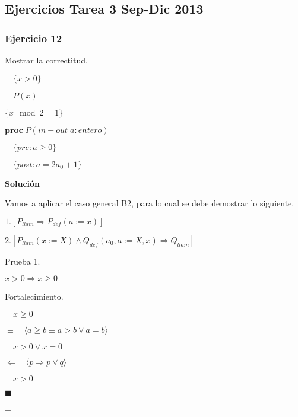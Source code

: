 \documentclass[hidelinks]{article}
\newenvironment{absolutelynopagebreak}
{\par\nobreak\vfil\penalty0\vfilneg
	\vtop\bgroup}
{\par\xdef\tpd{\the\prevdepth}\egroup
	\prevdepth=\tpd}
\begin{document}
\newpage

\subsection{Ejercicios Tarea 3 Sep-Dic 2013}

\subsubsection{Ejercicio 12}


Mostrar la correctitud.\par

$\quad \{x > 0\}$ \par
$\quad P(x)$ \par
$\{ x \mod 2 = 1\}$ \par

$\textbf{proc} \; P(in-out \; a: entero)$ \par
$\quad \{pre: a \geq 0\}$ \par
$\quad \{post: a = 2a_0+1\}$\par

\textbf{Solución}\par

Vamos a aplicar el caso general B2, para lo cual se debe demostrar lo
siguiente.\par

$1. [P_{llam} \Rightarrow P_{def}(a := x)]$\par
$2. [P_{llam}(x := X) \land Q_{def}(a_0,a := X, x) \Rightarrow Q_{llam}]$\par

\begin{absolutelynopagebreak}
	Prueba 1.\par
	$x > 0 \Rightarrow x \geq 0$\par

	Fortalecimiento.\par
	$\quad x \geq 0$\par
	$\equiv \quad \langle a \geq b \equiv a > b \lor a = b \rangle$\par
	$\quad x > 0 \lor x = 0$\par
	$\Leftarrow \quad \langle p \Rightarrow p \lor q \rangle$\par
	$\quad x > 0$\par
	$\blacksquare$\par
\end{absolutelynopagebreak}
\end{document}
